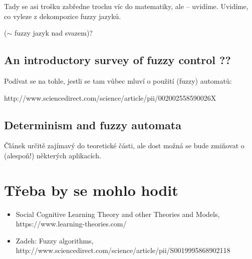 \documentclass[a4paper,10pt]{article}
\begin{document}
Tady se asi trošku zabředne trochu víc do matematiky, ale -- uvidíme. Uvidíme, co vyleze z dekompozice fuzzy jazyků.

\begin{definition}
  ($\sim$ fuzzy jazyk nad svazem)?
\end{definition}



\subsection{An introductory survey of fuzzy control ??}

Podívat se na tohle, jestli se tam vůbec mluví o použití (fuzzy) automatů:

http://www.sciencedirect.com/science/article/pii/002002558590026X

\subsection{Determinism and fuzzy automata \cite{Bel-DetFuzzAut}}

Článek určitě zajímavý do teoretické části, ale dost možná se bude zmiňovat o (alespoň!) některých aplikacích.


\section{Třeba by se mohlo hodit}
\begin{itemize}
 \item Social Cognitive Learning Theory and other Theories and Models, https://www.learning-theories.com/
 \item Zadeh: Fuzzy algorithms, http://www.sciencedirect.com/science/article/pii/S0019995868902118
\end{itemize}

\newpage


\end{document}

